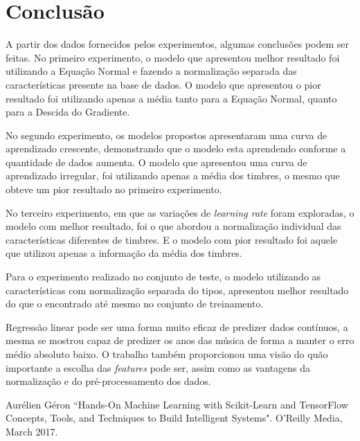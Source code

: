 \documentclass[conference]{IEEEtran}
\begin{document}
\section{Conclusão} \label{sec:conc}

A partir dos dados fornecidos pelos experimentos, algumas conclusões podem ser feitas. No primeiro experimento, o modelo que apresentou melhor resultado foi utilizando a Equação Normal e fazendo a normalização separada das características presente na base de dados. O modelo que apresentou o pior resultado foi utilizando apenas a média tanto para a Equação Normal, quanto para a Descida do Gradiente.

No segundo experimento, os modelos propostos apresentaram uma curva de aprendizado crescente, demonstrando que o modelo esta aprendendo conforme a quantidade de dados aumenta. O modelo que apresentou uma curva de aprendizado irregular, foi utilizando apenas a média dos timbres, o mesmo que obteve um pior resultado no primeiro experimento.

No terceiro experimento, em que as variações de \textit{learning rate} foram exploradas, o modelo com melhor resultado, foi o que abordou a normalização individual das características diferentes de timbres. E o modelo com pior resultado foi aquele que utilizou apenas a informação da média dos timbres.

Para o experimento realizado no conjunto de teste, o modelo utilizando as características com normalização separada do tipos, apresentou melhor resultado do que o encontrado até mesmo no conjunto de treinamento. 

Regressão linear pode ser uma forma muito eficaz de predizer dados contínuos, a mesma se mostrou capaz de predizer os anos das música de forma a manter o erro médio absoluto baixo. O trabalho também proporcionou uma visão do quão importante a escolha das \emph{features} pode ser, assim como as vantagens da normalização e do pré-processamento dos dados.


\begin{thebibliography}{00}
 Aurélien Géron ``Hands-On Machine Learning with Scikit-Learn and TensorFlow
Concepts, Tools, and Techniques to Build Intelligent Systems". O'Reilly Media, March 2017.
\end{thebibliography}
\end{document}
